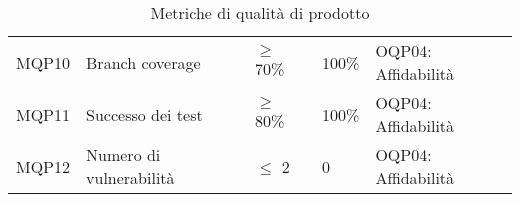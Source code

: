 \begin{table}[H]
\begin{tabular}{ m{}<{\centering}  m{}<{\centering}  m{}<{\centering}  m{}<{\centering} m{}<{\centering}}
        \rowcolor{gray!25}
        MQP10 &
        Branch coverage &
        $\geq$ 70\% &
        100\% &
        OQP04: Affidabilità \\

        MQP11 &
        Successo dei test &
        $\geq$ 80\% &
        100\% &
        OQP04: Affidabilità \\

        \rowcolor{gray!25}
        MQP12 &
        Numero di vulnerabilità &
        $\leq$ 2 &
        0 &
        OQP04: Affidabilità \\
    \end{tabular}
    \caption{Metriche di qualità di prodotto}
\end{table}